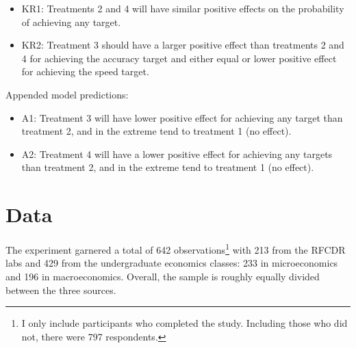 \documentclass[
  12,
  letterpaper,
  DIV=11,
  numbers=noendperiod]{scrartcl}
\providecommand{\tightlist}{%
  \setlength{\itemsep}{0pt}\setlength{\parskip}{0pt}}
\begin{document}
\begin{itemize}
\tightlist
\item
  KR1: Treatments 2 and 4 will have similar positive effects on the
  probability of achieving any target.
\item
  KR2: Treatment 3 should have a larger positive effect than treatments
  2 and 4 for achieving the accuracy target and either equal or lower
  positive effect for achieving the speed target.
\end{itemize}

\noindent Appended model predictions:

\begin{itemize}
\tightlist
\item
  A1: Treatment 3 will have lower positive effect for achieving any
  target than treatment 2, and in the extreme tend to treatment 1 (no
  effect).
\item
  A2: Treatment 4 will have a lower positive effect for achieving any
  targets than treatment 2, and in the extreme tend to treatment 1 (no
  effect).
\end{itemize}

\section{Data}\label{data}

The experiment garnered a total of 642 observations\footnote{I only
  include participants who completed the study. Including those who did
  not, there were 797 respondents.} with 213 from the RFCDR labs and 429
from the undergraduate economics classes: 233 in microeconomics and 196
in macroeconomics. Overall, the sample is roughly equally divided
between the three sources.
\end{document}
